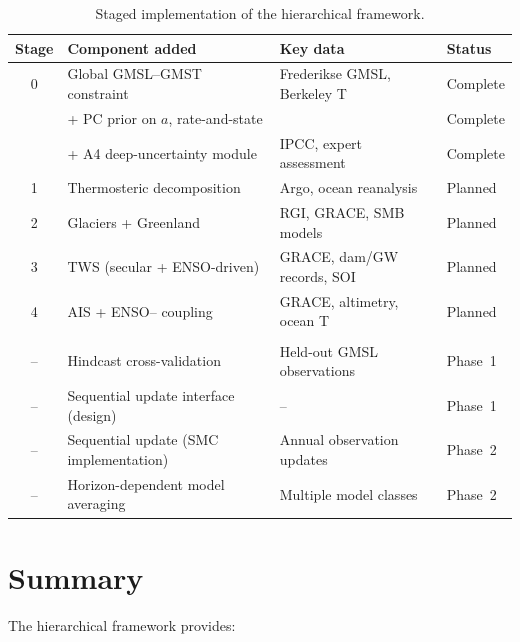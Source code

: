 \documentclass[11pt]{article}
\newcommand{\CDW}{\text{CDW}}
\begin{document}
\begin{table}[ht]
\centering
\caption{Staged implementation of the hierarchical framework.}
\label{tab:roadmap}
\begin{tabular}{clll}
\toprule
Stage & Component added & Key data & Status \\
\midrule
0 & Global GMSL--GMST constraint & Frederikse GMSL, Berkeley T & Complete \\
  & \quad + PC prior on $a$, rate-and-state & & Complete \\
  & \quad + A4 deep-uncertainty module & IPCC, expert assessment & Complete \\
1 & Thermosteric decomposition & Argo, ocean reanalysis & Planned \\
2 & Glaciers + Greenland & RGI, GRACE, SMB models & Planned \\
3 & TWS (secular + ENSO-driven) & GRACE, dam/GW records, SOI & Planned \\
4 & AIS + ENSO--\CDW{} coupling & GRACE, altimetry, ocean T & Planned \\
\addlinespace
\multicolumn{4}{l}{\textit{Cross-cutting capabilities}} \\
\addlinespace
-- & Hindcast cross-validation & Held-out GMSL observations & Phase~1 \\
-- & Sequential update interface (design) & -- & Phase~1 \\
-- & Sequential update (SMC implementation) & Annual observation updates & Phase~2 \\
-- & Horizon-dependent model averaging & Multiple model classes & Phase~2 \\
\bottomrule
\end{tabular}
\end{table}


\section{Summary}
\label{sec:summary}

The hierarchical framework provides:
\end{document}
